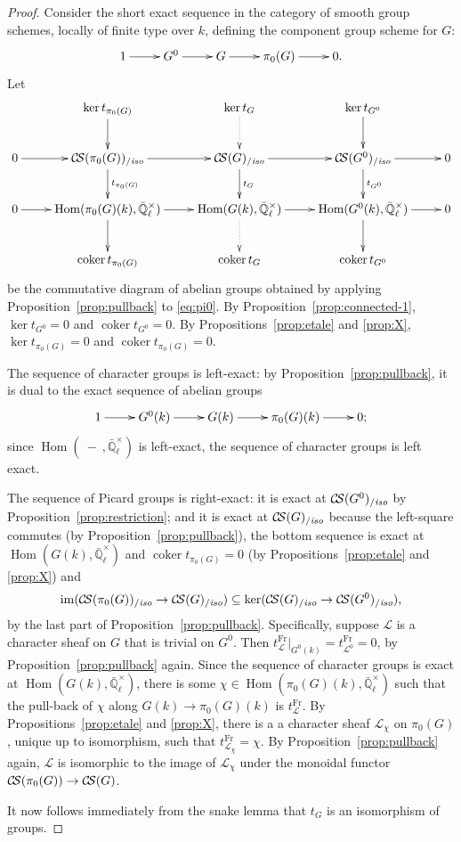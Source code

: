 \documentclass[11pt]{amsart}
\theoremstyle{plain}
\theoremstyle{definition}
\theoremstyle{remark}
\newcommand{\EE}{\mathbb{\bar Q}_\ell}
\newcommand{\Fq}{k}
\newcommand{\EEx}{\EE^\times}
\newcommand{\Frob}{{\operatorname{Fr}}}
\DeclareMathOperator{\Hom}{Hom}
\DeclareMathOperator{\coker}{coker}
\newcommand{\cs}[1]{{\mathcal{#1}}}
\newcommand{\CS}{{\mathcal{C\hskip-1.8pt S}}}
\newcommand{\CSiso}[1]{\CS(#1)_{/\textit{iso}}}
\newcommand{\image}{{\operatorname{im}}}
\begin{document}
\begin{proof}
  Consider the short exact sequence in the category of smooth group
  schemes, locally of finite type over $\Fq$, defining the component
  group scheme for $G$:
  \begin{equation}\label{eq:pi0}
    \xymatrix{
      1 \ar[r] & G^0 \ar[r] & G \ar[r] & \pi_0(G) \ar[r] & 0.
      }
  \end{equation}
  Let
  \[
  \xymatrix{
    & \ar[d] \ker t_{\pi_0(G)} & \ar@{.>}[d] \ker t_{G} & \ar[d] \ker t_{G^0} & \\
    0\ar[r] & \ar[d]^{t_{\pi_0(G)}} \CSiso{\pi_0(G)} \ar[r]
    & \ar[d]^{t_{G}} \CSiso{G} \ar[r] & \ar[d]^{t_{G^0}} \CSiso{G^0} \ar[r] & 0\\
    0 \ar[r] & \ar[d] \Hom(\pi_0(G)(\Fq),\EEx) \ar[r]
    & \ar@{.>}[d] \Hom(G(\Fq),\EEx) \ar[r] & \ar[d] \Hom(G^0(\Fq),\EEx) \ar[r] & 0\\
    & \coker t_{\pi_0(G)} & \coker t_{G} &  \coker t_{G^0} & \\
    }
  \]
  be the commutative diagram of abelian groups obtained by applying
  Proposition~\ref{prop:pullback} to \eqref{eq:pi0}.  By
  Proposition~\ref{prop:connected-1}, $\ker t_{G^0} =0$ and $\coker t_{G^0}=0$.
  By Propositions~\ref{prop:etale} and \ref{prop:X}, $\ker t_{\pi_0(G)}=0$
  and $\coker t_{\pi_0(G)}=0$.

  The sequence of character groups is left-exact: by
  Proposition~\ref{prop:pullback}, it is dual to the exact sequence of
  abelian groups
  \begin{equation}\label{eq:pi0}
    \xymatrix{
      1 \ar[r] & G^0(\Fq) \ar[r] & G(\Fq) \ar[r] & \pi_0(G)(\Fq) \ar[r] & 0;
    }
  \end{equation}
  since $\Hom(\ - \ ,\EEx)$ is left-exact, the sequence of
  character groups is left exact.

  The sequence of Picard groups is right-exact: it is exact at
  $\CSiso{G^0}$ by Proposition~\ref{prop:restriction}; and
  it is exact at $\CSiso{G}$ because the left-square
  commutes (by Proposition~\ref{prop:pullback}), the bottom sequence
  is exact at $\Hom(G(\Fq),\EEx)$ and $\coker t_{\pi_0(G)} =0$
  (by Propositions~\ref{prop:etale} and \ref{prop:X}) and
  \[
  \image(\CSiso{\pi_0(G)} \to \CSiso{G}) \subseteq \ker(\CSiso{G} \to \CSiso{G^0}),
  \]
  by the last part of Proposition~\ref{prop:pullback}. Specifically,
  suppose $\cs{L}$ is a character sheaf on $G$ that is trivial on
  $G^0$. Then $t^\Frob_\cs{L}\vert_{G^0(\Fq)} = t^\Frob_{\cs{L}^0} =0$,
  by Proposition~\ref{prop:pullback} again. Since the sequence of
  character groups is exact at $\Hom(G(\Fq),\EEx)$, there is
  some $\chi \in \Hom(\pi_0(G)(\Fq),\EEx)$ such that the
  pull-back of $\chi$ along $G(\Fq)\to \pi_0(G)(\Fq)$ is
  $t^\Frob_\cs{L}$. By Propositions~\ref{prop:etale} and \ref{prop:X},
  there is a a character sheaf $\cs{L}_\chi$ on $\pi_0(G)$, unique up
  to isomorphism, such that $t^\Frob_{\cs{L}_\chi} = \chi$. By
  Proposition~\ref{prop:pullback} again, $\cs{L}$ is isomorphic to the
  image of $\cs{L}_\chi$ under the monoidal functor $\CS(\pi_0(G)) \to \CS(G)$.

  It now follows immediately from the snake lemma that $t_{G}$ is an
  isomorphism of groups.
\end{proof}
\end{document}
